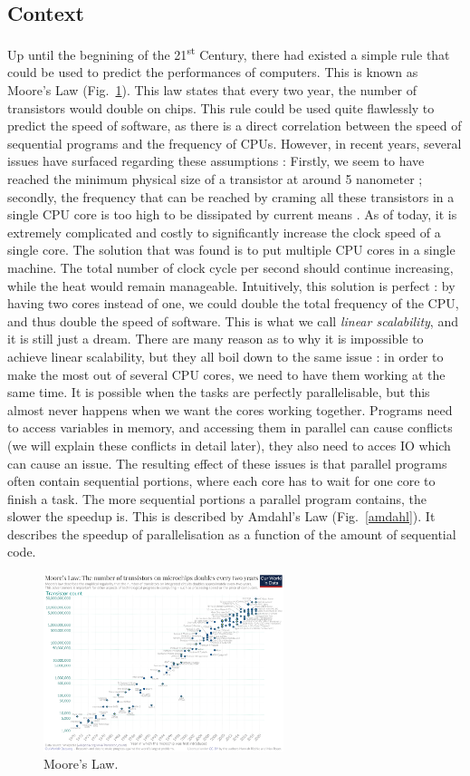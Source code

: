 \documentclass[conference]{IEEEtran}
\begin{document}
\subsection{Context}
Up until the begnining of the 21\textsuperscript{st} Century, there had existed a simple rule that could be used to predict the performances of computers. This is known as Moore's Law (Fig.~\ref{moore}). This law states that every two year, the number of transistors would double on chips. This rule could be used quite flawlessly to predict the speed of software, as there is a direct correlation between the speed of sequential programs and the frequency of CPUs. However, in recent years, several issues have surfaced regarding these assumptions : Firstly, we seem to have reached the minimum physical size of a transistor at around 5 nanometer ; secondly, the frequency that can be reached by craming all these transistors in a single CPU core is too high to be dissipated by current means \cite{moore}. As of today, it is extremely complicated and costly to significantly increase the clock speed of a single core. The solution that was found is to put multiple CPU cores in a single machine. The total number of clock cycle per second should continue increasing, while the heat would remain manageable. Intuitively, this solution is perfect : by having two cores instead of one, we could double the total frequency of the CPU, and thus double the speed of software. This is what we call \textit{linear scalability}, and it is still just a dream. There are many reason as to why it is impossible to achieve linear scalability, but they all boil down to the same issue : in order to make the most out of several CPU cores, we need to have them working at the same time. It is possible when the tasks are perfectly parallelisable, but this almost never happens when we want the cores working together. Programs need to access variables in memory, and accessing them in parallel can cause conflicts (we will explain these conflicts in detail later), they also need to acces IO which can cause an issue. The resulting effect of these issues is that parallel programs often contain sequential portions, where each core has to wait for one core to finish a task. The more sequential portions a parallel program contains, the slower the speedup is. This is described by Amdahl's Law \cite{amdahl} (Fig.~\ref{amdahl}). It describes the speedup of parallelisation as a function of the amount of sequential code.

\begin{figure}[!ht]
\centerline{\includegraphics[width=70mm]{moore.png}}
\caption{Moore's Law.}\label{moore}
\end{figure}
\end{document}
